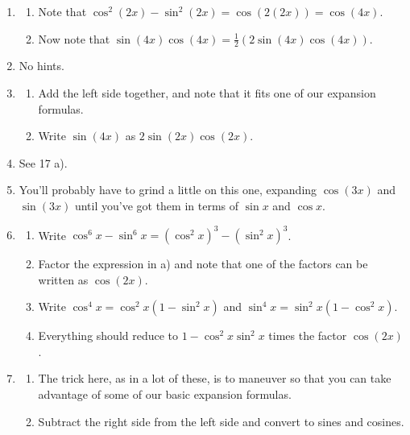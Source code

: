 \documentclass[english]{book}
\begin{document}
\begin{enumerate}
\begin{enumerate}
\begin{enumerate}[\hspace{1cm}a)]
              \end{enumerate}
        \item \begin{enumerate}[\hspace{1cm}a)]
                \item Note that $\cos^{2}(2x) - \sin^{2}(2x) = \cos(2(2x)) = \cos(4x)$.
                \item Now note that $\sin(4x)\cos(4x)=\frac{1}{2}(2 \sin(4x) \cos(4x))$.
              \end{enumerate}
        \item No hints.
        \item \begin{enumerate}[\hspace{1cm}a)]
                \item Add the left side together, and note that it fits one of our expansion formulas.
                \item Write $\sin(4x)$ as $2 \sin(2x) \cos(2x)$.
              \end{enumerate}
        \item See 17 a).
        \item You'll probably have to grind a little on this one, expanding $\cos(3x)$ and $\sin(3x)$ until you've got them in terms of $\sin x$ and $\cos x$.
        \item \begin{enumerate}[\hspace{1cm}a)]
                \item Write $\cos^{6} x - \sin^{6} x = (\cos^{2} x)^3 - (\sin^{2} x)^3$.
                \item Factor the expression in a) and note that one of the factors can be written as $\cos(2x)$.
                \item Write $\cos^{4} x = \cos^{2} x (1 - \sin^{2} x)$ and $\sin^{4} x = \sin^{2} x (1 - \cos^{2} x)$.
                \item Everything should reduce to $1 - \cos^{2} x \sin^{2} x$ times the factor $\cos(2x)$.
              \end{enumerate}
        \item \begin{enumerate}[\hspace{1cm}a)]
                \item The trick here, as in a lot of these, is to maneuver so that you can take advantage of some of our basic expansion formulas.
                \item Subtract the right side from the left side and convert to sines and cosines.

\end{enumerate}
\end{enumerate}
\end{enumerate}
\end{document}
